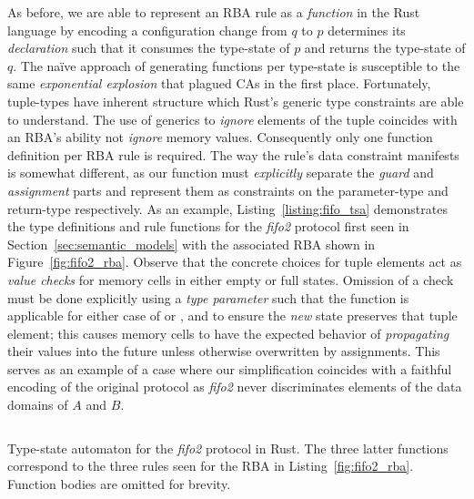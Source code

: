 As before, we are able to represent an RBA rule as a \textit{function} in the Rust language by encoding a configuration change from $q$ to $p$ determines its \textit{declaration} such that it consumes the type-state of $p$ and returns the type-state of $q$. The na{\"i}ve approach of generating functions per type-state is susceptible to the same \textit{exponential explosion} that plagued CAs in the first place. Fortunately, tuple-types have inherent structure which Rust's generic type constraints are able to understand. The use of generics to \textit{ignore} elements of the tuple coincides with an RBA's ability not \textit{ignore} memory values. Consequently only one function definition per RBA rule is required. The way the rule's data constraint manifests is somewhat different, as our function must \textit{explicitly} separate the \textit{guard} and \textit{assignment} parts and represent them as constraints on the parameter-type and return-type respectively. As an example, Listing~\ref{listing:fifo_tsa} demonstrates the type definitions and rule functions for the \textit{fifo2} protocol first seen in Section~\ref{sec:semantic_models} with the associated RBA shown in Figure~\ref{fig:fifo2_rba}. Observe that the concrete choices for tuple elements act as \textit{value checks} for memory cells in either empty or full states. Omission of a check must be done explicitly using a \textit{type parameter} such that the function is applicable for either case of  or , and to ensure the \textit{new} state preserves that tuple element; this causes memory cells to have the expected behavior of \textit{propagating} their values into the future unless otherwise overwritten by assignments. This serves as an example of a case where our simplification coincides with a faithful encoding of the original protocol as \textit{fifo2} never discriminates elements of the data domains of $A$ and $B$.


\begin{listing}[ht]
	\inputminted[]{rust}{fifo_tsa.rs}
	\caption[Type state automaton in Rust for the fifo2 connector.]{Type-state automaton for the \textit{fifo2} protocol in Rust. The three latter functions correspond to the three rules seen for the RBA in Listing~\ref{fig:fifo2_rba}. Function bodies are omitted for brevity.}
	\label{listing:fifo_tsa}
\end{listing}



